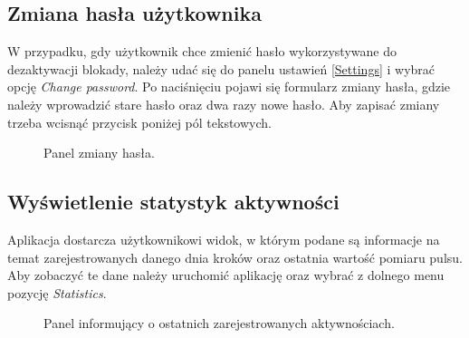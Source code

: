\subsection{Zmiana hasła użytkownika}
W przypadku, gdy użytkownik chce zmienić hasło wykorzystywane do dezaktywacji blokady, należy udać się do panelu ustawień \ref{Settings} i wybrać opcję \textit{Change password}. Po naciśnięciu pojawi się formularz zmiany hasła, gdzie należy wprowadzić stare hasło oraz dwa razy nowe hasło. Aby zapisać zmiany trzeba wcisnąć przycisk poniżej pól tekstowych.
\begin{figure}[H]
    \begin{center}
        \setlength{\fboxsep}{0pt}%
        \setlength{\fboxrule}{0.3pt}%
    \end{center}
    \caption{{\color{dgray}Panel zmiany hasła.}} \label{changePassword}
\end{figure}
\subsection{Wyświetlenie statystyk aktywności}
Aplikacja dostarcza użytkownikowi widok, w którym podane są informacje na temat zarejestrowanych danego dnia kroków oraz ostatnia wartość pomiaru pulsu. Aby zobaczyć te dane należy uruchomić aplikację oraz wybrać z dolnego menu pozycję \textit{Statistics}.
\begin{figure}[H]
    \begin{center}
        \setlength{\fboxsep}{0pt}%
        \setlength{\fboxrule}{0.3pt}%
    \end{center}
    \caption{{\color{dgray}Panel informujący o ostatnich zarejestrowanych aktywnościach.}} \label{Stats}
\end{figure}
